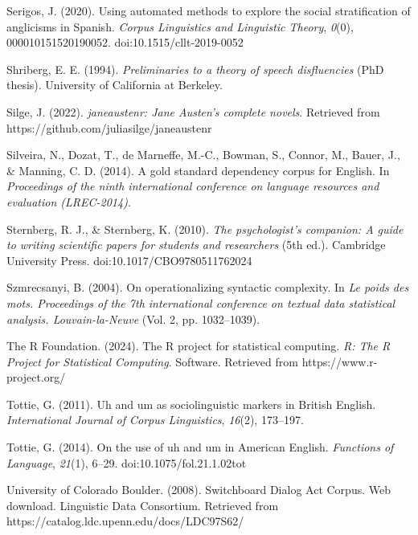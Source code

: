 \documentclass[
  letterpaper,
  krantz1]{latex/krantz-mod}
\newlength{\cslhangindent}
\newenvironment{CSLReferences}[2] %
 {\begin{list}{}{%
  \setlength{\itemindent}{0pt}
  \setlength{\leftmargin}{0pt}
  \setlength{\parsep}{0pt}
  \ifodd #1
   \setlength{\leftmargin}{\cslhangindent}
   \setlength{\itemindent}{-1\cslhangindent}
  \fi
  \setlength{\itemsep}{#2\baselineskip}}}
 {\end{list}}
\theoremstyle{definition}
\theoremstyle{definition}
\theoremstyle{remark}
\begin{document}
\begin{CSLReferences}{1}{0}
Serigos, J. (2020). Using automated methods to explore the social
stratification of anglicisms in {Spanish}. \emph{Corpus Linguistics and
Linguistic Theory}, \emph{0}(0), 000010151520190052.
doi:10.1515/cllt-2019-0052

Shriberg, E. E. (1994). \emph{Preliminaries to a theory of speech
disfluencies} (PhD thesis). University of California at Berkeley.

Silge, J. (2022). \emph{{janeaustenr}: Jane {A}usten's complete novels}.
Retrieved from https://github.com/juliasilge/janeaustenr

Silveira, N., Dozat, T., de Marneffe, M.-C., Bowman, S., Connor, M.,
Bauer, J., \& Manning, C. D. (2014). A gold standard dependency corpus
for {English}. In \emph{Proceedings of the ninth international
conference on language resources and evaluation ({LREC-2014})}.

Sternberg, R. J., \& Sternberg, K. (2010). \emph{The psychologist's
companion: A guide to writing scientific papers for students and
researchers} (5th ed.). Cambridge University Press.
doi:10.1017/CBO9780511762024

Szmrecsanyi, B. (2004). On operationalizing syntactic complexity. In
\emph{Le poids des mots. {Proceedings} of the 7th international
conference on textual data statistical analysis. {Louvain-la-Neuve}}
(Vol. 2, pp. 1032--1039).

The R Foundation. (2024). The {R} project for statistical computing.
\emph{R: The R Project for Statistical Computing}. Software. Retrieved
from https://www.r-project.org/

Tottie, G. (2011). Uh and um as sociolinguistic markers in {British
English}. \emph{International Journal of Corpus Linguistics},
\emph{16}(2), 173--197.

Tottie, G. (2014). On the use of uh and um in {American English}.
\emph{Functions of Language}, \emph{21}(1), 6--29.
doi:10.1075/fol.21.1.02tot

University of Colorado Boulder. (2008). Switchboard {Dialog Act Corpus}.
{Web} download. Linguistic Data Consortium. Retrieved from
https://catalog.ldc.upenn.edu/docs/LDC97S62/


\end{CSLReferences}
\end{document}
